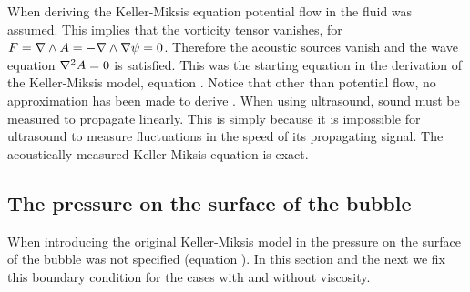 When deriving the Keller-Miksis equation potential flow in the fluid was assumed.
This implies that the vorticity tensor vanishes, for
$F = \nabla \wedge A = -\nabla \wedge \nabla \psi = 0$.
Therefore the acoustic sources vanish and the wave equation $\nabla^2 A =0$ is satisfied.
This was the starting equation in the derivation of the Keller-Miksis model, 
equation . 
Notice that other than potential flow, no approximation  has been made to derive .
When using ultrasound, sound must be measured to propagate linearly.
This is simply because it is impossible for ultrasound to measure fluctuations in the speed of its propagating signal.
The acoustically-measured-Keller-Miksis equation is exact.




\subsection{The pressure on the surface of the bubble}\label{sec:surface_pressure}

When introducing the original Keller-Miksis model in  the pressure on the surface of the bubble was not specified (equation ).
In this section and the next we fix this boundary condition for the cases with and without viscosity.



